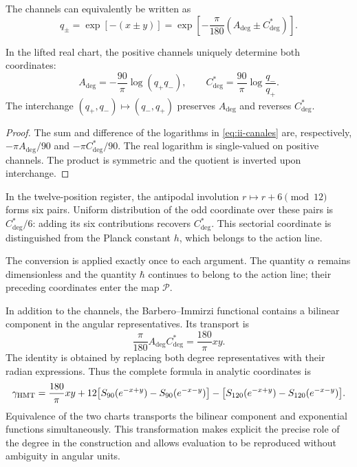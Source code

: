 The channels can equivalently be written as
\begin{equation}
 q_\pm=\exp[-(x\pm y)]
 =\exp\!\left[-\frac{\pi}{180}(A_{\deg}\pm C^*_{\deg})\right].
\label{eq:ii-canales}
\end{equation}
\begin{proposition}
\label{prop:ii-inversion-canales-angulares}
In the lifted real chart, the positive channels uniquely
determine both coordinates:
\[
 A_{\deg}=-\frac{90}{\pi}\log(q_+q_-),\qquad
 C^*_{\deg}=\frac{90}{\pi}\log\frac{q_-}{q_+}.
\]
The interchange \((q_+,q_-)\mapsto(q_-,q_+)\) preserves
\(A_{\deg}\) and reverses \(C^*_{\deg}\).
\end{proposition}
\begin{proof}
The sum and difference of the logarithms in
\eqref{eq:ii-canales} are, respectively,
\(-\pi A_{\deg}/90\) and \(-\pi C^*_{\deg}/90\).
The real logarithm is single-valued on positive channels.
The product is symmetric and the quotient is inverted upon interchange.
\end{proof}
In the twelve-position register, the antipodal involution
\(r\mapsto r+6\pmod {12}\) forms six pairs. Uniform
distribution of the odd coordinate over these pairs is
\(C^*_{\deg}/6\): adding its six contributions recovers
\(C^*_{\deg}\). This sectorial coordinate is distinguished from
the Planck constant \(h\), which belongs to the action line.

The conversion is applied exactly once to each argument. The quantity
\(\alpha\) remains dimensionless and the quantity \(\hbar\)
continues to belong to the action line; their preceding coordinates
enter the map \(\mathcal P\).

In addition to the channels, the Barbero--Immirzi functional contains a
bilinear component in the angular representatives. Its transport is
\begin{equation}
 \frac{\pi}{180}A_{\deg}C^*_{\deg}
 =\frac{180}{\pi}xy.
 \label{eq:ii-barbero-cartas}
\end{equation}
The identity is obtained by replacing both degree representatives
with their radian expressions. Thus the complete formula in
analytic coordinates is
\[
 \gamma_{\mathrm{HMT}}
 =\frac{180}{\pi}xy
 +12\bigl[S_{90}(e^{-x+y})-S_{90}(e^{-x-y})\bigr]
 -\bigl[S_{120}(e^{-x+y})-S_{120}(e^{-x-y})\bigr].
\]
Equivalence of the two charts transports the bilinear component
and exponential functions simultaneously. This transformation
makes explicit the precise role of the degree in the construction and allows
evaluation to be reproduced without ambiguity in angular units.
\par\endgroup
